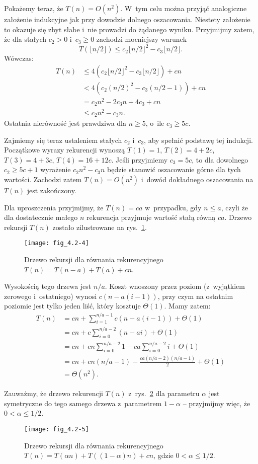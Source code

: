 Pokażemy teraz, że $T(n)=O(n^2)$.
W~tym celu można przyjąć analogiczne założenie indukcyjne jak przy dowodzie dolnego oszacowania.
Niestety założenie to okazuje się zbyt słabe i~nie prowadzi do żądanego wyniku.
Przyjmijmy zatem, że dla stałych $c_2>0$ i~$c_3\ge0$ zachodzi mocniejszy warunek
\[
	T(\lfloor n/2\rfloor) \le c_2\lfloor n/2\rfloor^2-c_3\lfloor n/2\rfloor.
\]
Wówczas:
\begin{align*}
	T(n) &\le 4(c_2\lfloor n/2\rfloor^2-c_3\lfloor n/2\rfloor)+cn \\
	&< 4(c_2(n/2)^2-c_3(n/2-1))+cn \\
	&= c_2n^2-2c_3n+4c_3+cn \\
	&\le c_2n^2-c_3n.
\end{align*}
Ostatnia nierówność jest prawdziwa dla $n\ge5$, o~ile $c_3\ge5c$.

Zajmiemy się teraz ustaleniem stałych $c_2$ i~$c_3$, aby spełnić podstawę tej indukcji.
Początkowe wyrazy rekurencji wynoszą $T(1)=1$, $T(2)=4+2c$, $T(3)=4+3c$, $T(4)=16+12c$.
Jeśli przyjmiemy $c_3=5c$, to dla dowolnego $c_2\ge5c+1$ wyrażenie $c_2n^2-c_3n$ będzie stanowić oszacowanie górne dla tych wartości.
Zachodzi zatem $T(n)=O(n^2)$ i~dowód dokładnego oszacowania na $T(n)$ jest zakończony.

\exercise %
Dla uproszczenia przyjmijmy, że $T(n)=ca$ w~przypadku, gdy $n\le a$, czyli że dla dostatecznie małego $n$ rekurencja przyjmuje wartość stałą równą $ca$.
Drzewo rekursji $T(n)$ zostało zilustrowane na rys.\ \ref{fig:4.2-4}.
\begin{figure}[ht]
	\centering \texttt{[image: fig\_4.2-4]}
	\caption{Drzewo rekursji dla równania rekurencyjnego $T(n)=T(n-a)+T(a)+cn$.} \label{fig:4.2-4}
\end{figure}
Wysokością tego drzewa jest $n/a$.
Koszt wnoszony przez  poziom (z~wyjątkiem zerowego i~ostatniego) wynosi $c(n-a(i-1))$, przy czym na ostatnim poziomie jest tylko jeden liść, który kosztuje $\Theta(1)$.
Mamy zatem:
\begin{align*}
	T(n) &= cn+\sum_{i=1}^{n/a-1}c(n-a(i-1))+\Theta(1) \\
	&= cn+c\sum_{i=0}^{n/a-2}(n-ai)+\Theta(1) \\
	&= cn+cn\sum_{i=0}^{n/a-2}1-ca\sum_{i=0}^{n/a-2}i+\Theta(1) \\
	&= cn+cn(n/a-1)-\frac{ca(n/a-2)(n/a-1)}{2}+\Theta(1) \\
	&= \Theta(n^2).
\end{align*}

\exercise %
Zauważmy, że drzewo rekurencji $T(n)$ z~rys.\ \ref{fig:4.2-5} dla parametru $\alpha$ jest symetryczne do tego samego drzewa z~parametrem $1-\alpha$ -- przyjmijmy więc, że $0<\alpha\le1/2$.
\begin{figure}[ht]
	\centering \texttt{[image: fig\_4.2-5]}
	\caption{Drzewo rekursji dla równania rekurencyjnego $T(n)=T(\alpha n)+T((1-\alpha)n)+cn$, gdzie $0<\alpha\le1/2$.} \label{fig:4.2-5}
\end{figure}

